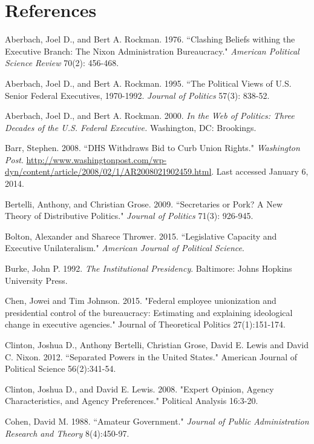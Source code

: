 \documentclass[12pt]{article}
\begin{document}
\newpage
\section*{References}
\singlespacing
\noindent \hangindent=0.7cm Aberbach, Joel D.,  and Bert A. Rockman. 1976. ``Clashing Beliefs withing the Executive Branch: The Nixon Administration Bureaucracy." \textit{American Political Science Review} 70(2): 456-468. 

\noindent \hangindent=0.7cm Aberbach, Joel D., and Bert A. Rockman. 1995. ``The Political Views of U.S. Senior Federal Executives, 1970-1992. \textit{Journal of Politics} 57(3): 838-52. 

\noindent \hangindent=0.7cm Aberbach, Joel D., and Bert A. Rockman. 2000. \textit{In the Web of Politics: Three Decades of the U.S. Federal Executive.} Washington, DC: Brookings.

\noindent \hangindent=0.7cm Barr, Stephen. 2008. ``DHS Withdraws Bid to Curb Union Rights." \textit{Washington Post}. \url{http://www.washingtonpost.com/wp-dyn/content/article/2008/02/1/AR2008021902459.html}. Last accessed January 6, 2014.

\noindent \hangindent=0.7cm Bertelli, Anthony, and Christian Grose. 2009. ``Secretaries or Pork? A New Theory of Distributive Politics." \textit{Journal of Politics} 71(3): 926-945. 

\noindent \hangindent=0.7cm Bolton, Alexander and Sharece Thrower. 2015. ``Legislative Capacity and Executive Unilateralism." \textit{American Journal of Political Science}. 

\noindent \hangindent=0.7cm Burke, John P. 1992. \textit{The Institutional Presidency}. Baltimore: Johns Hopkins University Press. 

\noindent \hangindent=0.7cm Chen, Jowei and Tim Johnson. 2015. "Federal employee unionization and presidential control of the bureaucracy: Estimating and explaining ideological change in executive agencies." Journal of Theoretical Politics 27(1):151-174.

\noindent \hangindent=0.7cm Clinton, Joshua D., Anthony Bertelli, Christian Grose, David E. Lewis and David C. Nixon. 2012. ``Separated Powers in the United States." American Journal of Political Science 56(2):341-54.

\noindent \hangindent=0.7cm Clinton, Joshua D., and David E. Lewis. 2008. "Expert Opinion, Agency Characteristics, and Agency Preferences." Political Analysis 16:3-20.

\noindent \hangindent=0.7cm Cohen, David M. 1988. ``Amateur Government." \textit{Journal of Public Administration Research and Theory} 8(4):450-97. 
\end{document}
